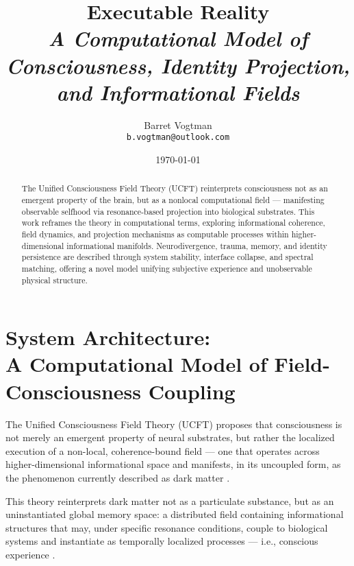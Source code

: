 \documentclass[titlepage]{article}
\title{\Huge \textbf{Executable Reality}\\[0.5em]
\large \textit{A Computational Model of Consciousness, Identity Projection, and Informational Fields}}
\author{\Large Barret Vogtman\\
\normalsize\texttt{b.vogtman@outlook.com}}
\date{\normalsize\today}
\begin{document}
\maketitle
{}
\setcounter{page}{1}  

\thispagestyle{empty}
\begin{abstract}
\vspace{1em}
\noindent
The Unified Consciousness Field Theory (UCFT) reinterprets consciousness not as an emergent property of the brain, but as a nonlocal computational field — manifesting observable selfhood via resonance-based projection into biological substrates. This work reframes the theory in computational terms, exploring informational coherence, field dynamics, and projection mechanisms as computable processes within higher-dimensional informational manifolds. Neurodivergence, trauma, memory, and identity persistence are described through system stability, interface collapse, and spectral matching, offering a novel model unifying subjective experience and unobservable physical structure.
\end{abstract}


\cleardoublepage
\setcounter{page}{2}  
\tableofcontents
\cleardoublepage

\setcounter{page}{1}  

\section{\texorpdfstring{System Architecture:\\ A Computational Model of Field-Consciousness Coupling}{System Architecture: A Computational Model of Field-Consciousness Coupling}}

The Unified Consciousness Field Theory (UCFT) proposes that consciousness is not merely an emergent property of neural substrates, but rather the localized execution of a non-local, coherence-bound field — one that operates across higher-dimensional informational space and manifests, in its uncoupled form, as the phenomenon currently described as dark matter \parencite{lloyd2006, deutsch1997}.

This theory reinterprets dark matter not as a particulate substance, but as an uninstantiated global memory space: a distributed field containing informational structures that may, under specific resonance conditions, couple to biological systems and instantiate as temporally localized processes — i.e., conscious experience \parencite{aaronson2013}.
\end{document}
